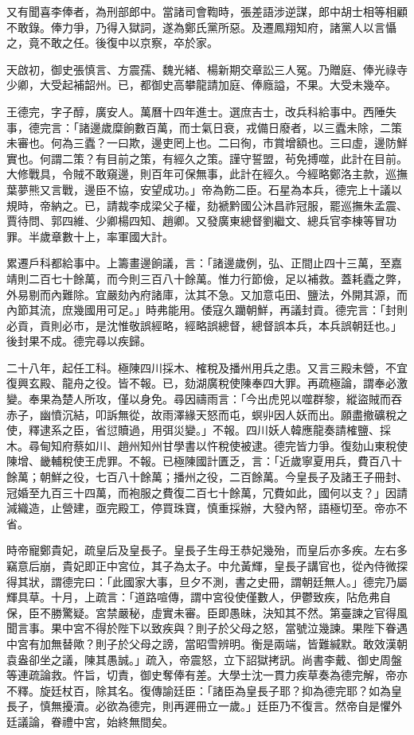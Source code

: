 \begin{pinyinscope}
又有聞喜李俸者，為刑部郎中。當諸司會鞫時，張差語涉逆謀，郎中胡士相等相顧不敢錄。俸力爭，乃得入獄詞，遂為鄭氏黨所惡。及遷鳳翔知府，諸黨人以言懾之，竟不敢之任。後復中以京察，卒於家。

天啟初，御史張慎言、方震孺、魏光緒、楊新期交章訟三人冤。乃贈庭、俸光祿寺少卿，大受起補韶州。已，都御史高攀龍請加庭、俸廕謚，不果。大受未幾卒。

王德完，字子醇，廣安人。萬曆十四年進士。選庶吉士，改兵科給事中。西陲失事，德完言：「諸邊歲糜餉數百萬，而士氣日衰，戎備日廢者，以三蠹未除，二策未審也。何為三蠹？一曰欺，邊吏罔上也。二曰徇，市賞增額也。三曰虛，邊防鮮實也。何謂二策？有目前之策，有經久之策。謹守誓盟，茍免搏噬，此計在目前。大修戰具，令賊不敢窺邊，則百年可保無事，此計在經久。今經略鄭洛主款，巡撫葉夢熊又言戰，邊臣不協，安望成功。」帝為飭二臣。石星為本兵，德完上十議以規時，帝納之。已，請裁李成梁父子權，劾褫黔國公沐昌祚冠服，罷巡撫朱孟震、賈待問、郭四維、少卿楊四知、趙卿。又發廣東總督劉繼文、總兵官李棟等冒功罪。半歲章數十上，率軍國大計。

累遷戶科都給事中。上籌畫邊餉議，言：「諸邊歲例，弘、正間止四十三萬，至嘉靖則二百七十餘萬，而今則三百八十餘萬。惟力行節儉，足以補救。蓋耗蠹之弊，外易剔而內難除。宜嚴劾內府諸庫，汰其不急。又加意屯田、鹽法，外開其源，而內節其流，庶幾國用可足。」時弗能用。倭寇久躪朝鮮，再議封貢。德完言：「封則必貢，貢則必市，是沈惟敬誤經略，經略誤總督，總督誤本兵，本兵誤朝廷也。」後封果不成。德完尋以疾歸。

二十八年，起任工科。極陳四川採木、榷稅及播州用兵之患。又言三殿未營，不宜復興玄殿、龍舟之役。皆不報。已，劾湖廣稅使陳奉四大罪。再疏極論，謂奉必激變。奉果為楚人所攻，僅以身免。尋因禱雨言：「今出虎兕以噬群黎，縱盜賊而吞赤子，幽憤沉結，叩訴無從，故雨澤緣天怒而屯，螟丱因人妖而出。願盡撤礦稅之使，釋逮系之臣，省愆贖過，用弭災變。」不報。四川妖人韓應龍奏請榷鹽、採木。尋甸知府蔡如川、趙州知州甘學書以忤稅使被逮。德完皆力爭。復劾山東稅使陳增、畿輔稅使王虎罪。不報。已極陳國計匱乏，言：「近歲寧夏用兵，費百八十餘萬；朝鮮之役，七百八十餘萬；播州之役，二百餘萬。今皇長子及諸王子冊封、冠婚至九百三十四萬，而袍服之費復二百七十餘萬，冗費如此，國何以支？」因請減織造，止營建，亟完殿工，停買珠寶，慎重採辦，大發內帑，語極切至。帝亦不省。

時帝寵鄭貴妃，疏皇后及皇長子。皇長子生母王恭妃幾殆，而皇后亦多疾。左右多竊意后崩，貴妃即正中宮位，其子為太子。中允黃輝，皇長子講官也，從內侍微探得其狀，謂德完曰：「此國家大事，旦夕不測，書之史冊，謂朝廷無人。」德完乃屬輝具草。十月，上疏言：「道路喧傳，謂中宮役使僅數人，伊鬱致疾，阽危弗自保，臣不勝驚疑。宮禁嚴秘，虛實未審。臣即愚昧，決知其不然。第臺諫之官得風聞言事。果中宮不得於陛下以致疾與？則子於父母之怒，當號泣幾諫。果陛下眷遇中宮有加無替歟？則子於父母之謗，當昭雪辨明。衡是兩端，皆難緘默。敢效漢朝袁盎卻坐之議，陳其愚誠。」疏入，帝震怒，立下詔獄拷訊。尚書李戴、御史周盤等連疏論救。忤旨，切責，御史奪俸有差。大學士沈一貫力疾草奏為德完解，帝亦不釋。旋廷杖百，除其名。復傳諭廷臣：「諸臣為皇長子耶？抑為德完耶？如為皇長子，慎無擾瀆。必欲為德完，則再遲冊立一歲。」廷臣乃不復言。然帝自是懼外廷議論，眷禮中宮，始終無間矣。


\end{pinyinscope}
